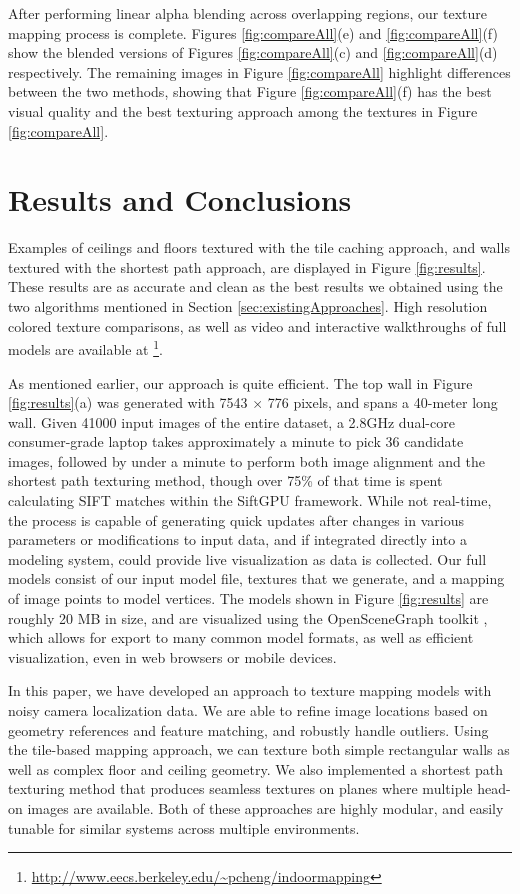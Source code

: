 \documentclass[]{spie}  %
\begin{document}
After performing linear alpha blending across overlapping regions, our
texture mapping process is complete. Figures \ref{fig:compareAll}(e)
and \ref{fig:compareAll}(f) show the blended versions of Figures
\ref{fig:compareAll}(c) and \ref{fig:compareAll}(d) respectively. The
remaining images in Figure \ref{fig:compareAll} highlight differences
between the two methods, showing that Figure \ref{fig:compareAll}(f)
has the best visual quality and the best texturing approach among the
textures in Figure \ref{fig:compareAll}.

\section{Results and Conclusions}
\label{sec:resultsAndConclusions}
Examples of ceilings and floors textured with the tile caching
approach, and walls textured with the shortest path approach, are
displayed in Figure \ref{fig:results}. These results are as accurate
and clean as the best results we obtained using the two algorithms
mentioned in Section \ref{sec:existingApproaches}. High resolution
colored texture comparisons, as well as video and interactive
walkthroughs of full models are available at
\footnote{\url{http://www.eecs.berkeley.edu/~pcheng/indoormapping}}.

As mentioned earlier, our approach is quite efficient. The top wall in
Figure \ref{fig:results}(a) was generated with 7543 $\times$ 776
pixels, and spans a 40-meter long wall. Given 41000 input images of
the entire dataset, a 2.8GHz dual-core consumer-grade laptop takes
approximately a minute to pick 36 candidate images, followed by under
a minute to perform both image alignment and the shortest path
texturing method, though over 75\% of that time is spent calculating
SIFT matches within the SiftGPU framework. While not real-time, the
process is capable of generating quick updates after changes in
various parameters or modifications to input data, and if integrated
directly into a modeling system, could provide live visualization as
data is collected. Our full models consist of our input model file,
textures that we generate, and a mapping of image points to model
vertices. The models shown in Figure \ref{fig:results} are roughly 20
MB in size, and are visualized using the OpenSceneGraph toolkit
\cite{openscenegraph}, which allows for export to many common model
formats, as well as efficient visualization, even in web browsers or
mobile devices.

In this paper, we have developed an approach to texture mapping models
with noisy camera localization data. We are able to refine image
locations based on geometry references and feature matching, and
robustly handle outliers. Using the tile-based mapping approach, we
can texture both simple rectangular walls as well as complex floor and
ceiling geometry. We also implemented a shortest path texturing method
that produces seamless textures on planes where multiple head-on
images are available. Both of these approaches are highly modular, and
easily tunable for similar systems across multiple environments.
\end{document}
